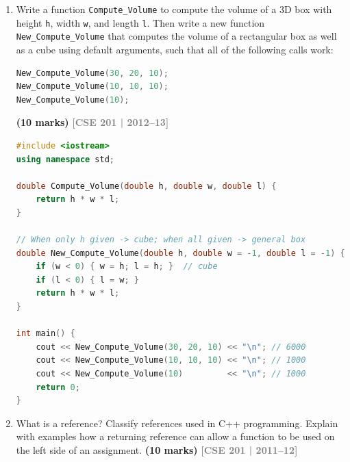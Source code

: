 \documentclass[12pt,a3paper]{article}
\newcommand{\yr}[1]{\hfill\textcolor{gray}{\small\textbf{[#1]}}}
\newcommand{\mk}[1]{\textcolor{orange!70!black}{\small\textbf{(#1 marks)}}}
\begin{document}
\begin{enumerate}
\begin{tcolorbox}
\textbf{Correct versions:}
\begin{lstlisting}[language=C++]
double area(double length, double width = 0);    // OK
double area(double width = 0, double length = 1); // OK
\end{lstlisting}

\end{tcolorbox}

\item Write a function \texttt{Compute\_Volume} to compute the volume of a 3D box with height \texttt{h}, width \texttt{w}, and length \texttt{l}. Then write a new function \texttt{New\_Compute\_Volume} that computes the volume of a rectangular box as well as a cube using default arguments, such that all of the following calls work:
\begin{lstlisting}[language=C++]
New_Compute_Volume(30, 20, 10);
New_Compute_Volume(10, 10, 10);
New_Compute_Volume(10);
\end{lstlisting}
\mk{10}
\yr{CSE 201 | 2012--13}

\begin{tcolorbox}[enhanced,breakable,ansbox,colback=cC!4,colframe=cC,
  boxrule=0.8pt,arc=5pt,
  title={\textbf{Answer --- New\_Compute\_Volume with default arguments}},
  fonttitle=\bfseries\color{white},colbacktitle=cC]

\begin{lstlisting}[language=C++]
#include <iostream>
using namespace std;

double Compute_Volume(double h, double w, double l) {
    return h * w * l;
}

// When only h given -> cube; when all given -> general box
double New_Compute_Volume(double h, double w = -1, double l = -1) {
    if (w < 0) { w = h; l = h; }  // cube
    if (l < 0) { l = w; }
    return h * w * l;
}

int main() {
    cout << New_Compute_Volume(30, 20, 10) << "\n"; // 6000
    cout << New_Compute_Volume(10, 10, 10) << "\n"; // 1000
    cout << New_Compute_Volume(10)         << "\n"; // 1000
    return 0;
}
\end{lstlisting}

\end{tcolorbox}


\item What is a reference? Classify references used in C++ programming. Explain with examples how a returning reference can allow a function to be used on the left side of an assignment. \mk{10}
\yr{CSE 201 | 2011--12}


\end{enumerate}
\end{document}
